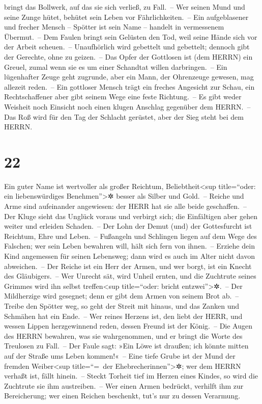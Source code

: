 bringt das Bollwerk, auf das sie sich verließ, zu Fall.~--
Wer seinen Mund und seine Zunge hütet, behütet sein Leben
vor Fährlichkeiten.~-- Ein aufgeblasener und frecher
Mensch -- Spötter ist sein Name -- handelt in vermessenem Übermut.~--
Dem Faulen bringt sein Gelüsten den Tod, weil seine Hände
sich vor der Arbeit scheuen.~-- Unaufhörlich wird
gebettelt und gebettelt; dennoch gibt der Gerechte, ohne zu geizen.~--
Das Opfer der Gottlosen ist (dem HERRN) ein Greuel, zumal
wenn sie es um einer Schandtat willen darbringen.~-- Ein
lügenhafter Zeuge geht zugrunde, aber ein Mann, der Ohrenzeuge gewesen,
mag allezeit reden.~-- Ein gottloser Mensch trägt ein
freches Angesicht zur Schau, ein Rechtschaffener aber gibt seinem Wege
eine feste Richtung.~-- Es gibt weder Weisheit noch
Einsicht noch einen klugen Anschlag gegenüber dem HERRN.~--
Das Roß wird für den Tag der Schlacht gerüstet, aber der
Sieg steht bei dem HERRN.

\hypertarget{section-21}{%
\section{22}\label{section-21}}

Ein guter Name ist wertvoller als großer Reichtum,
Beliebtheit\textless sup title=``oder: ein liebenswürdiges
Benehmen''\textgreater✲ besser als Silber und Gold.~--
Reiche und Arme sind aufeinander angewiesen: der HERR hat
sie alle beide geschaffen.~-- Der Kluge sieht das Unglück
voraus und verbirgt sich; die Einfältigen aber gehen weiter und erleiden
Schaden.~-- Der Lohn der Demut (und) der Gottesfurcht ist
Reichtum, Ehre und Leben.~-- Fußangeln und Schlingen
liegen auf dem Wege des Falschen; wer sein Leben bewahren will, hält
sich fern von ihnen.~-- Erziehe dein Kind angemessen für
seinen Lebensweg; dann wird es auch im Alter nicht davon abweichen.~--
Der Reiche ist ein Herr der Armen, und wer borgt, ist ein
Knecht des Gläubigers.~-- Wer Unrecht sät, wird Unheil
ernten, und die Zuchtrute seines Grimmes wird ihn selbst
treffen\textless sup title=``oder: bricht entzwei''\textgreater✲.~--
Der Mildherzige wird gesegnet; denn er gibt dem Armen von
seinem Brot ab.~-- Treibe den Spötter weg, so geht der
Streit mit hinaus, und das Zanken und Schmähen hat ein Ende.~--
Wer reines Herzens ist, den liebt der HERR, und wessen
Lippen herzgewinnend reden, dessen Freund ist der König.~--
Die Augen des HERRN bewahren, was sie wahrgenommen, und
er bringt die Worte des Treulosen zu Fall.~-- Der Faule
sagt: »Ein Löwe ist draußen; ich könnte mitten auf der Straße ums Leben
kommen!«~-- Eine tiefe Grube ist der Mund der fremden
Weiber\textless sup title=``=~der Ehebrecherinnen''\textgreater✲; wer
dem HERRN verhaßt ist, fällt hinein.~-- Steckt Torheit
tief im Herzen eines Kindes, so wird die Zuchtrute sie ihm
austreiben.~-- Wer einen Armen bedrückt, verhilft ihm zur
Bereicherung; wer einen Reichen beschenkt, tut's nur zu dessen
Verarmung.

